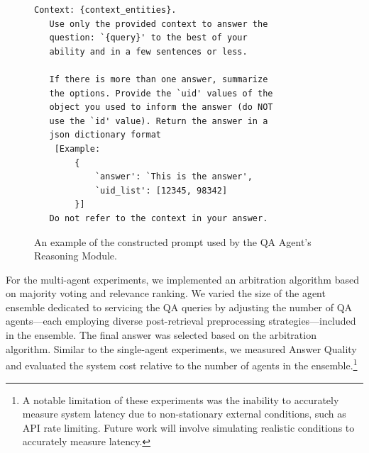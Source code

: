 \documentclass[sigconf,nonacm]{acmart}
\begin{document}
\begin{figure}[H]
\centering
\begin{tcolorbox}[
    colback=blue!5!white, 
    colframe=blue!75!black, 
    width=\linewidth, 
    title=Prompt Example,
    boxsep=2pt,    %
    left=2pt, 
    right=2pt, 
    top=2pt, 
    bottom=2pt
]
\begin{lstlisting}[basicstyle=\linespread{1.1}\selectfont\ttfamily\small, aboveskip=0pt, belowskip=0pt]
   Context: {context_entities}.
   Use only the provided context to answer the 
   question: `{query}' to the best of your 
   ability and in a few sentences or less.
   
   If there is more than one answer, summarize 
   the options. Provide the `uid' values of the 
   object you used to inform the answer (do NOT 
   use the `id' value). Return the answer in a 
   json dictionary format 
    [Example: 
        {
            `answer': `This is the answer', 
            `uid_list': [12345, 98342]
        }]
   Do not refer to the context in your answer.
\end{lstlisting}
\end{tcolorbox}
\caption{An example of the constructed prompt used by the QA Agent's Reasoning Module.}
\label{fig:prompt-example}
\end{figure}







For the multi-agent experiments, we implemented an arbitration algorithm based on majority voting and relevance ranking. We varied the size of the agent ensemble dedicated to servicing the QA queries by adjusting the number of QA agents—each employing diverse post-retrieval preprocessing strategies—included in the ensemble. The final answer was selected based on the arbitration algorithm. Similar to the single-agent experiments, we measured Answer Quality and evaluated the system cost relative to the number of agents in the ensemble.\footnote{A notable limitation of these experiments was the inability to accurately measure system latency due to non-stationary external conditions, such as API rate limiting. Future work will involve simulating realistic conditions to accurately measure latency.}
\end{document}
